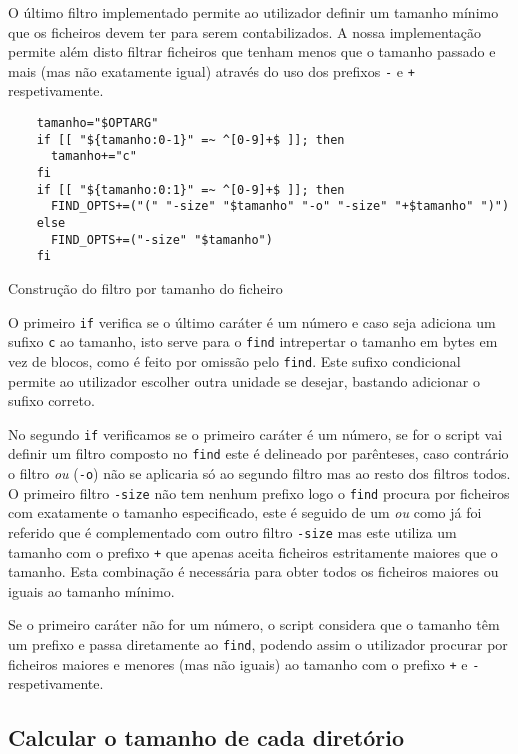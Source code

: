 O último filtro implementado permite ao utilizador definir um tamanho mínimo que
os ficheiros devem ter para serem contabilizados. A nossa implementação permite
além disto filtrar ficheiros que tenham menos que o tamanho passado e mais (mas
não exatamente igual) através do uso dos prefixos \Verb|-| e \Verb|+|
respetivamente.

\begin{listing}[H]
	\centering
	\begin{verbatim}
    tamanho="$OPTARG"
    if [[ "${tamanho:0-1}" =~ ^[0-9]+$ ]]; then
      tamanho+="c"
    fi
    if [[ "${tamanho:0:1}" =~ ^[0-9]+$ ]]; then
      FIND_OPTS+=("(" "-size" "$tamanho" "-o" "-size" "+$tamanho" ")")
    else
      FIND_OPTS+=("-size" "$tamanho")
    fi
  \end{verbatim}
	\caption{Construção do filtro por tamanho do ficheiro}
\end{listing}

O primeiro \Verb|if| verifica se o último caráter é um número e caso seja
adiciona um sufixo \Verb|c| ao tamanho, isto serve para o \Verb|find|
intrepertar o tamanho em bytes em vez de blocos, como é feito por omissão pelo
\Verb|find|. Este sufixo condicional permite ao utilizador escolher outra
unidade se desejar, bastando adicionar o sufixo correto.

No segundo \Verb|if| verificamos se o primeiro caráter é um número, se for o
script vai definir um filtro composto no \Verb|find| este é delineado por
parênteses, caso contrário o filtro \emph{ou} (\Verb|-o|) não se aplicaria só ao
segundo filtro mas ao resto dos filtros todos. O primeiro filtro \Verb|-size|
não tem nenhum prefixo logo o \Verb|find| procura por ficheiros com exatamente o
tamanho especificado, este é seguido de um \emph{ou} como já foi referido que é
complementado com outro filtro \Verb|-size| mas este utiliza um tamanho com o
prefixo \Verb|+| que apenas aceita ficheiros estritamente maiores que o tamanho.
Esta combinação é necessária para obter todos os ficheiros maiores ou iguais ao
tamanho mínimo.

Se o primeiro caráter não for um número, o script considera que o tamanho têm um
prefixo e passa diretamente ao \Verb|find|, podendo assim o utilizador procurar
por ficheiros maiores e menores (mas não iguais) ao tamanho com o prefixo
\Verb|+| e \Verb|-| respetivamente.

\subsection{Calcular o tamanho de cada diretório}
\label{sec:implementation_calculate_size}

